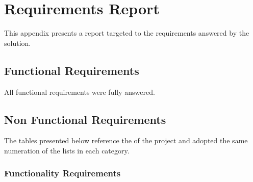 \chapter{Requirements Report}
\label{appendix:requirement}

This appendix presents a report targeted to the requirements answered by the solution.

\section{Functional Requirements}

All functional requirements were fully answered.

\section{Non Functional Requirements}

The tables presented below reference the  of the project and adopted the same numeration of the lists in each category.

\subsection{Functionality Requirements}
\label{appendix:requirement:functionality}

